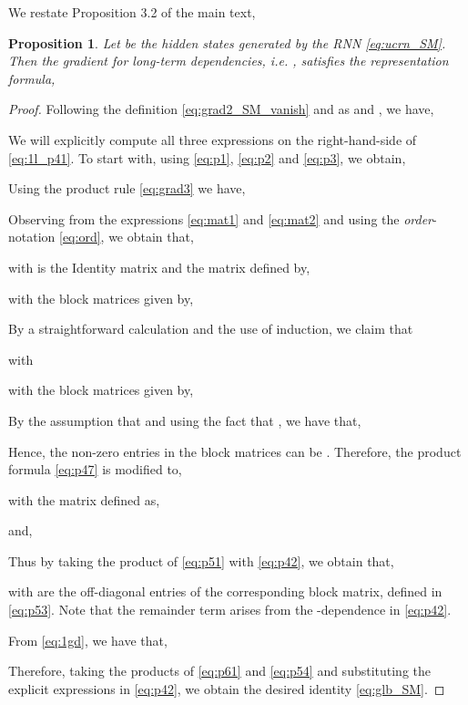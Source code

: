 \documentclass{article}
\newtheorem{proposition}[theorem]{Proposition}
\begin{document}
We restate Proposition 3.2 of the main text,
\begin{proposition}
\label{prop:4_SM}
Let  be the hidden states generated by the RNN \eqref{eq:ucrn_SM}. Then the gradient for long-term dependencies, i.e. , satisfies the representation formula,

\end{proposition}
\begin{proof}
Following the definition \eqref{eq:grad2_SM_vanish} and as  and , we have,

We will explicitly compute all three expressions on the right-hand-side of \eqref{eq:1l_p41}. To start with, using \eqref{eq:p1}, \eqref{eq:p2} and \eqref{eq:p3}, we obtain,

Using the product rule \eqref{eq:grad3} we have,

Observing from the expressions \eqref{eq:mat1} and \eqref{eq:mat2} and using the \emph{order}-notation \eqref{eq:ord}, we obtain that,

with  is the  Identity matrix and the matrix  defined by,

with the block matrices  given by,

By a straightforward calculation and the use of induction, we claim that 

with 

with the block matrices  given by,

By the assumption that  and using the fact that , we have that,

Hence, the non-zero entries in the block matrices can be . Therefore, the product formula \eqref{eq:p47} is modified to,

    with the  matrix  defined as,
    
and,

Thus by taking the product of \eqref{eq:p51} with \eqref{eq:p42}, we obtain that,

with  are the off-diagonal entries of the corresponding block matrix, defined in \eqref{eq:p53}. Note that the  remainder term arises from the -dependence in \eqref{eq:p42}.  

From \eqref{eq:1gd}, we have that,

 Therefore, taking the products of \eqref{eq:p61} and \eqref{eq:p54} and substituting the explicit expressions in \eqref{eq:p42}, we obtain the desired identity \eqref{eq:glb_SM}. 
 \end{proof}
\end{document}
